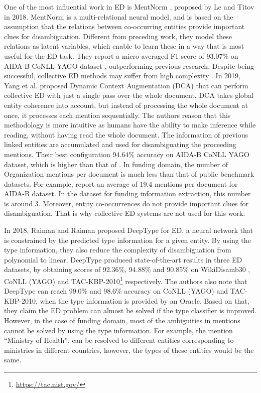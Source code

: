 \documentclass{report}
\theoremstyle{definition}
\theoremstyle{remark}
\begin{document}
One of the most influential work in ED is MentNorm \cite{mentnorm}, proposed by Le and Titov in 2018. MentNorm is a multi-relational neural model, and is based on the assumption that the relations between co-occurring entities provide important clues for disambiguation. Different from preceding work, they model these relations as latent variables, which enable to learn these in a way that is most useful for the ED task. They report a micro averaged F1 score of 93.07\% on AIDA-B CoNLL YAGO dataset \cite{CoNLLYago}, outperforming previous research. Despite being successful, collective ED methods may suffer from high complexity \cite{dca}. In 2019, Yang et al. \cite{dca} proposed Dynamic Context Augmentation (DCA) that can perform collective ED with just a single pass over the whole document. DCA takes global entity coherence into account, but instead of processing the whole document at once, it processes each mention sequentially. The authors reason that this methodology is more intuitive as humans have the ability to make inference while reading, without having read the whole document. The information of previous linked entities are accumulated and used for disambiguating the proceeding mentions. Their best configuration 94.64\% accuracy on AIDA-B CoNLL YAGO dataset, which is higher than that of \cite{mentnorm}. In funding domain, the number of Organization mentions per document is much less than that of public benchmark datasets. For example, \cite{dca} report an average of 19.4 mentions per document for AIDA-B dataset. In the dataset for funding information extraction, this number is around 3. Moreover, entity co-occurrences do not provide important clues for disambiguation. That is why collective ED systems are not used for this work.

In 2018, Raiman and Raiman proposed DeepType \cite{raiman} for ED, a neural network that is constrained by the predicted type information for a given entity. By using the type information, they also reduce the complexity of disambiguation from polynomial to linear. DeepType produced state-of-the-art results in three ED datasets, by obtaining scores of 92.36\%, 94.88\% and 90.85\% on WikiDisamb30 \cite{wikidisamb}, CoNLL (YAGO) \cite{CoNLLYago} and TAC-KBP-2010\footnote{\url{https://tac.nist.gov/}} respectively. The authors also note that DeepType can reach 99.0\% and 98.6\% accuracy on CoNLL (YAGO) and TAC-KBP-2010, when the type information is provided by an Oracle. Based on that, they claim the ED problem can almost be solved if the type classifier is improved. However, in the case of funding domain, most of the ambiguities in mentions cannot be solved by using the type information. For example, the mention ``Ministry of Health'', can be resolved to different entities corresponding to ministries in different countries, however,  the types of these entities would be the same.
\end{document}

